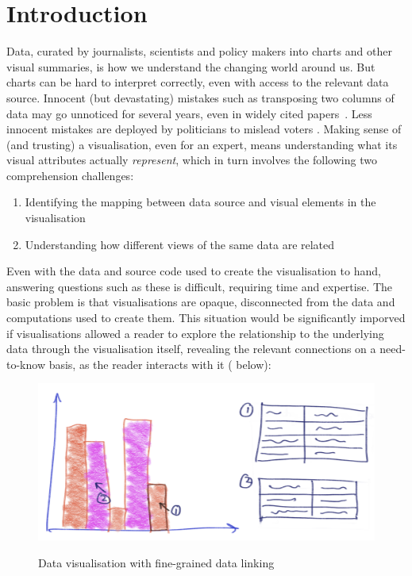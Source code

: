 \section{Introduction}

Data, curated by journalists, scientists and policy makers into charts and other visual summaries, is how we understand the changing world around us. But charts can be hard to interpret correctly, even with access to the relevant data source. Innocent (but devastating) mistakes such as transposing two columns of data may go unnoticed for several years, even in widely cited papers~\cite{miller06}. Less innocent mistakes are deployed by politicians to mislead voters \cite{fullfact19}. Making sense of (and trusting) a visualisation, even for an expert, means understanding what its visual attributes actually \emph{represent}, which in turn involves the following two comprehension challenges:

\begin{enumerate}
  \item Identifying the mapping between data source and visual elements in the visualisation
  \item Understanding how different views of the same data are related
\end{enumerate}

\noindent Even with the data and source code used to create the visualisation to hand, answering questions such as these is difficult, requiring time and expertise. The basic problem is that visualisations are opaque, disconnected from the data and computations used to create them. This situation would be significantly imporved if visualisations allowed a reader to explore the relationship to the underlying data through the visualisation itself, revealing the relevant connections on a need-to-know basis, as the reader interacts with it ( below):

\begin{figure}[H]
   {\includegraphics[scale=0.07]{fig/example/data-linking.png}}
   \caption{Data visualisation with fine-grained data linking}
   \label{fig:introduction:data-linking}
\end{figure}

